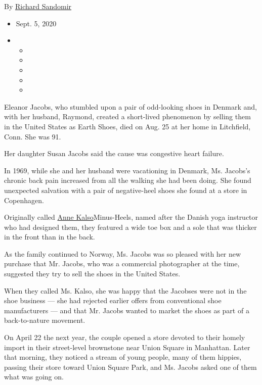 By \href{https://www.nytimes3xbfgragh.onion/by/richard-sandomir}{Richard
Sandomir}

\begin{itemize}
\item
  Sept. 5, 2020
\item
  \begin{itemize}
  \item
  \item
  \item
  \item
  \item
  \end{itemize}
\end{itemize}

Eleanor Jacobs, who stumbled upon a pair of odd-looking shoes in Denmark
and, with her husband, Raymond, created a short-lived phenomenon by
selling them in the United States as Earth Shoes, died on Aug. 25 at her
home in Litchfield, Conn. She was 91.

Her daughter Susan Jacobs said the cause was congestive heart failure.

In 1969, while she and her husband were vacationing in Denmark, Ms.
Jacobs's chronic back pain increased from all the walking she had been
doing. She found unexpected salvation with a pair of negative-heel shoes
she found at a store in Copenhagen.

Originally called
\href{http://foottalk.blogspot.com/2005/07/down-to-earth.html}{Anne
Kalso}Minus-Heels, named after the Danish yoga instructor who had
designed them, they featured a wide toe box and a sole that was thicker
in the front than in the back.

As the family continued to Norway, Ms. Jacobs was so pleased with her
new purchase that Mr. Jacobs, who was a commercial photographer at the
time, suggested they try to sell the shoes in the United States.

When they called Ms. Kalso, she was happy that the Jacobses were not in
the shoe business --- she had rejected earlier offers from conventional
shoe manufacturers --- and that Mr. Jacobs wanted to market the shoes as
part of a back-to-nature movement.

On April 22 the next year, the couple opened a store devoted to their
homely import in their street-level brownstone near Union Square in
Manhattan. Later that morning, they noticed a stream of young people,
many of them hippies, passing their store toward Union Square Park, and
Ms. Jacobs asked one of them what was going on.

